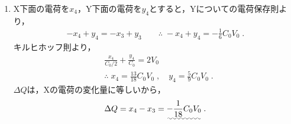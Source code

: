 \documentclass[../../../physics-standard_answers_all.tex]{subfiles}
\begin{document}
\begin{enumerate}
    \item X下面の電荷を$x_4$，Y下面の電荷を$y_4$とすると，Yについての電荷保存則より，
        \begin{align*}
            -x_4 + y_4 = -x_3 + y_3
            \qquad \text{∴} \; -x_4 + y_4 = -\frac{1}{6}C_0 V_0 \;.
        \end{align*}
        キルヒホッフ則より，
        \begin{align*}
            & \frac{x_4}{C_0/2} + \frac{y_4}{C_0} = 2V_0 \\
            & \text{∴} \; x_4 = \frac{13}{18}C_0 V_0 \;,
            \quad y_4 = \frac{5}{9}C_0 V_0 \;.
        \end{align*}
        $\Delta Q$は，Xの電荷の変化量に等しいから，
        \begin{align*}
            \Delta Q = x_4 - x_3 = \uwave{-\frac{1}{18}C_0 V_0} \;.
        \end{align*}
        
\end{enumerate}
\end{document}

